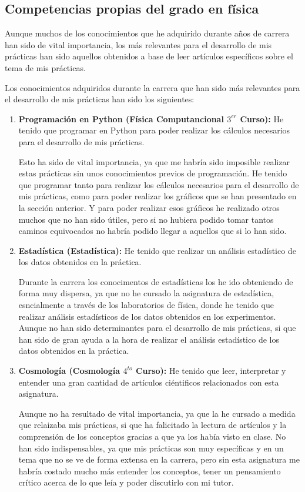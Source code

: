 \documentclass[12pt, a4paper]{article}
\theoremstyle{definition}
\begin{document}
\subsection{Competencias propias del grado en física}

Aunque muchos de los conocimientos que he adquirido durante años de carrera han sido de vital importancia, los más relevantes para el desarrollo de mis prácticas han sido aquellos obtenidos a base de leer artículos específicos sobre el tema de mis prácticas.

Los conocimientos adquiridos durante la carrera que han sido más relevantes para el desarrollo de mis prácticas han sido los siguientes:

\begin{enumerate}
  \item \textbf{Programación en Python (Física Computancional $3^{er}$ Curso):} He tenido que programar en Python para poder realizar los cálculos necesarios para el desarrollo de mis prácticas.

        Esto ha sido de vital importancia, ya que me habría sido imposible realizar estas prácticas sin unos conocimientos previos de programación. He tenido que programar tanto para realizar los cálculos necesarios para el desarrollo de mis prácticas, como para poder realizar los gráficos que se han presentado en la sección anterior. Y para poder realizar esos gráficos he realizado otros muchos que no han sido útiles, pero si no hubiera podido tomar tantos caminos equivocados no habría podido llegar a aquellos que si lo han sido.
  \item \textbf{Estadística (Estadística):} He tenido que realizar un análisis estadístico de los datos obtenidos en la práctica.

        Durante la carrera los conocimentos de estadísticas los he ido obteniendo de forma muy dispersa, ya que no he cursado la asignatura de estadística, esncialmente a través de los laboratorios de física, donde he tenido que realizar análisis estadísticos de los datos obtenidos en los experimentos. Aunque no han sido determinantes para el desarrollo de mis prácticas, si que han sido de gran ayuda a la hora de realizar el análisis estadístico de los datos obtenidos en la práctica.
  \item \textbf{Cosmología (Cosmología $4^{to}$ Curso):} He tenido que leer, interpretar y entender una gran cantidad de artículos ciéntificos relacionados con esta asignatura.

        Aunque no ha resultado de vital importancia, ya que la he cursado a medida que relaizaba mis prácticas, si que ha falicitado la lectura de artículos y la comprensión de los conceptos gracias a que ya los había visto en clase. No han sido indispensables, ya que mis prácticas son muy específicas y en un tema que no se ve de forma extensa en la carrera, pero sin esta asignatura me habría costado mucho más entender los conceptos, tener un pensamiento crítico acerca de lo que leía y poder discutirlo con mi tutor.
\end{enumerate}



\printbibliography
\end{document}
